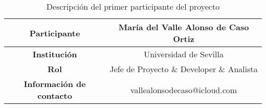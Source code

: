 \begin{table}[H]
    \centering
    \begin{tabular}{|c|c|}
    \hline
    \textbf{Participante} & María del Valle Alonso de Caso Ortiz \\
    \hline
    \textbf{Institución} & Universidad de Sevilla \\
    \hline
    \textbf{Rol} & Jefe de Proyecto \& Developer \& Analista \\
    \hline
    \textbf{Información de contacto} & vallealonsodecaso@icloud.com \\ 
    \hline
    \end{tabular}
\caption{Descripción del primer participante del proyecto}
\label{tab:primerParticipante}
\end{table}